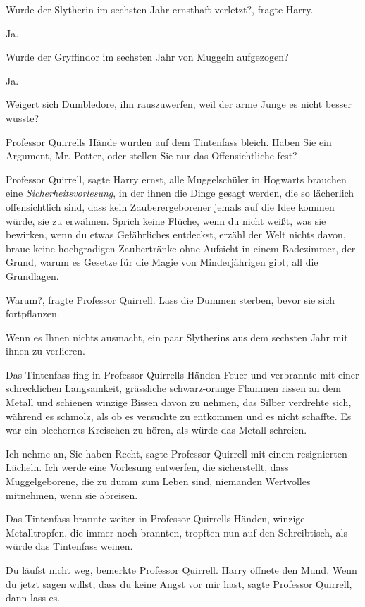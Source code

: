 \glqq Wurde der Slytherin im sechsten Jahr ernsthaft verletzt?\grqq{}, fragte
Harry.

\glqq Ja.\grqq{}

\glqq Wurde der Gryffindor im sechsten Jahr von Muggeln aufgezogen?\grqq{}

\glqq Ja.\grqq{}

\glqq Weigert sich Dumbledore, ihn rauszuwerfen, weil der arme Junge es nicht
besser wusste?\grqq{}

Professor Quirrells Hände wurden auf dem Tintenfass bleich. \glqq Haben Sie ein
Argument, Mr. Potter, oder stellen Sie nur das Offensichtliche fest?\grqq{}

\glqq Professor Quirrell\grqq{}, sagte Harry ernst, \glqq alle Muggelschüler in
Hogwarts brauchen eine \emph{Sicherheitsvorlesung}, in der ihnen die Dinge
gesagt werden, die so lächerlich offensichtlich sind, dass kein
Zauberergeborener jemals auf die Idee kommen würde, sie zu erwähnen. Sprich
keine Flüche, wenn du nicht weißt, was sie bewirken, wenn du etwas Gefährliches
entdeckst, erzähl der Welt nichts davon, braue keine hochgradigen Zaubertränke
ohne Aufsicht in einem Badezimmer, der Grund, warum es Gesetze für die Magie von
Minderjährigen gibt, all die Grundlagen.\grqq{}

\glqq Warum?\grqq{}, fragte Professor Quirrell. \glqq Lass die Dummen sterben,
bevor sie sich fortpflanzen.\grqq{}

\glqq Wenn es Ihnen nichts ausmacht, ein paar Slytherins aus dem sechsten Jahr
mit ihnen zu verlieren.\grqq{}

Das Tintenfass fing in Professor Quirrells Händen Feuer und verbrannte mit einer
schrecklichen Langsamkeit, grässliche schwarz-orange Flammen rissen an dem
Metall und schienen winzige Bissen davon zu nehmen, das Silber verdrehte sich,
während es schmolz, als ob es versuchte zu entkommen und es nicht schaffte. Es
war ein blechernes Kreischen zu hören, als würde das Metall schreien.

\glqq Ich nehme an, Sie haben Recht\grqq{}, sagte Professor Quirrell mit einem
resignierten Lächeln. \glqq Ich werde eine Vorlesung entwerfen, die
sicherstellt, dass Muggelgeborene, die zu dumm zum Leben sind, niemanden
Wertvolles mitnehmen, wenn sie abreisen.\grqq{}

Das Tintenfass brannte weiter in Professor Quirrells Händen, winzige
Metalltropfen, die immer noch brannten, tropften nun auf den Schreibtisch, als
würde das Tintenfass weinen.

\glqq Du läufst nicht weg\grqq{}, bemerkte Professor Quirrell. Harry öffnete den
Mund. \glqq Wenn du jetzt sagen willst, dass du keine Angst vor mir hast\grqq{},
sagte Professor Quirrell, \glqq dann lass es.\grqq{}

